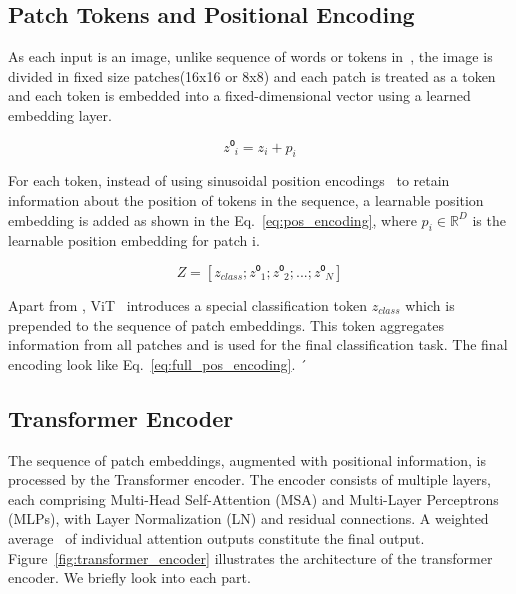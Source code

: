 \subsection{Patch Tokens and Positional Encoding}

As each input is an image, unlike sequence of words or tokens in~\cite{vaswani2023attentionneed}, the image is divided in fixed size patches(16x16 or 8x8) and each patch is treated as a token and each token is embedded into a fixed-dimensional vector using a learned embedding layer.

\begin{equation}
	\label{eq:pos_encoding}
	z⁰_i = z_i + p_i
\end{equation} 

For each token, instead of using sinusoidal position encodings~\cite{vaswani2023attentionneed} to retain information about the position of tokens in the sequence, a learnable position embedding is added as shown in the Eq.~\ref{eq:pos_encoding}, where \(p_i \in \mathbb{R}^{D}\) is the learnable position embedding for patch i. 

\begin{equation}
	\label{eq:full_pos_encoding}
	Z = [z_{class}; z⁰_1; z⁰_2;...; z⁰_N]
\end{equation}

Apart from \cite{vaswani2023attentionneed}, ViT~\cite{dosovitskiy2020image} introduces a special classification token \(z_{class}\) which is prepended to the sequence of patch embeddings. This token aggregates information from all patches and is used for the final classification task. The final encoding look like Eq.~\ref{eq:full_pos_encoding}.
´
\subsection{Transformer Encoder}
The sequence of patch embeddings, augmented with positional information, is processed by the Transformer encoder. The encoder consists of multiple layers, each comprising Multi-Head Self-Attention (MSA) and Multi-Layer Perceptrons (MLPs), with Layer Normalization (LN) and residual connections. A weighted average~\cite{weng2020transformer} of individual attention outputs constitute the final output. Figure~\ref{fig:transformer_encoder} illustrates the architecture of the transformer encoder. We briefly look into each part.

